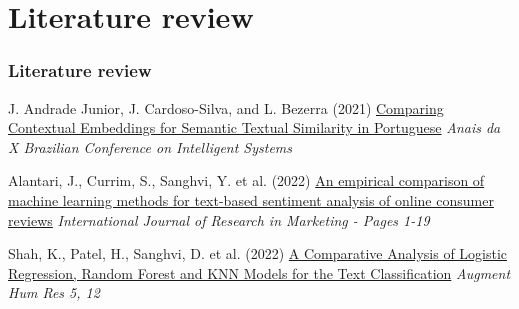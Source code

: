 \section{Literature review}
\begin{frame}
	\frametitle{Literature review}
	
	\begin{thebibliography}{99} %
	\footnotesize %
		\scriptsize
	

		J. Andrade Junior, J. Cardoso-Silva, and L. Bezerra (2021)
		\newblock \href{https://core.ac.uk/download/491169432.pdf}{Comparing Contextual Embeddings for	Semantic Textual Similarity in Portuguese}
		\newblock \scriptsize \emph{Anais da X Brazilian Conference on Intelligent Systems} 
		
				

		Alantari, J., Currim, S., Sanghvi, Y. et al. (2022)
		\newblock \href{https://doi.org/10.1016/j.ijresmar.2021.10.011}{An empirical comparison of machine learning methods for text-based sentiment analysis of online consumer reviews}
		\newblock \scriptsize \emph{International Journal of Research in Marketing - Pages 1-19} 

					
		Shah, K., Patel, H., Sanghvi, D. et al. (2022)
		\newblock \href{https://doi.org/10.1007/s41133-020-00032-0}{A Comparative Analysis of Logistic Regression, Random Forest and KNN Models for the Text Classification}
		\newblock \scriptsize \emph{Augment Hum Res 5, 12} 

		

		

\end{thebibliography}
\end{frame}
